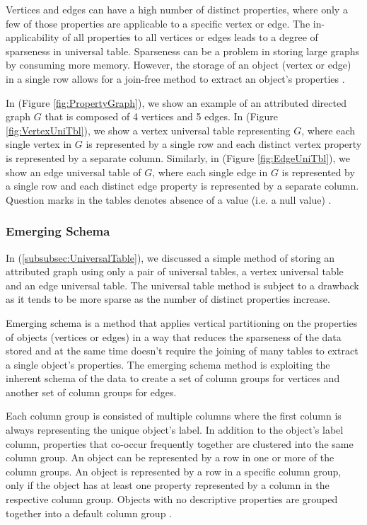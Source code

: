 {Vertices and edges can have a high number of distinct properties, where only a few of those properties are applicable to a specific vertex or edge. The in-applicability of all properties to all vertices or edges leads to a degree of sparseness in universal table. Sparseness can be a problem in storing large graphs by consuming more memory. However, the storage of an object (vertex or edge) in a single row allows for a join-free method to extract an object's properties \cite{Paradies2017}.

In (Figure \ref{fig:PropertyGraph}), we show an example of an attributed directed graph $G$ that is composed of 4 vertices and 5 edges. In (Figure \ref{fig:VertexUniTbl}), we show a vertex universal table representing $G$, where each single vertex in $G$ is represented by a single row and each distinct vertex property is represented by a separate column. Similarly, in (Figure \ref{fig:EdgeUniTbl}), we show an edge universal table of $G$, where each single edge in $G$ is represented by a single row and each distinct edge property is represented by a separate column. Question marks in the tables denotes absence of a value (i.e. a null value) \cite{Paradies2017}.


\subsubsection{Emerging Schema}
\label{subsubsec:EmergingSchema}

In (\ref{subsubsec:UniversalTable}), we discussed a simple method of storing an attributed graph using only a pair of universal tables, a vertex universal table and an edge universal table. The universal table method is subject to a drawback as it tends to be more sparse as the number of distinct properties increase.

Emerging schema is a method that applies vertical partitioning on the properties of objects (vertices or edges) in a way that reduces the sparseness of the data stored and at the same time doesn't require the joining of many tables to extract a single object's properties. The emerging schema method is exploiting the inherent schema of the data to create a set of column groups for vertices and another set of column groups for edges. 

Each column group is consisted of multiple columns where the first column is always representing the unique object's label. In addition to the object's label column, properties that co-occur frequently together are clustered into the same column group. An object can be represented by a row in one or more of the column groups. An object is represented by a row in a specific column group, only if the object has at least one property represented by a column in the respective column group. Objects with no descriptive properties are grouped together into a default column group \cite{Paradies2017}.

}

